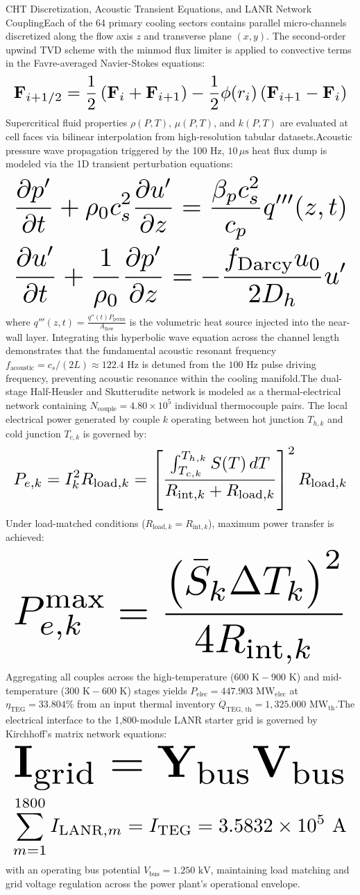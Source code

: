 CHT Discretization, Acoustic Transient Equations, and LANR Network CouplingEach of the 64 primary cooling sectors contains parallel micro-channels discretized along the flow axis $z$ and transverse plane $(x, y)$. The second-order upwind TVD scheme with the minmod flux limiter is applied to convective terms in the Favre-averaged Navier-Stokes equations:\[
\resizebox{\columnwidth}{!}{$\displaystyle \mathbf{F}_{i+1/2} = \frac{1}{2} \left( \mathbf{F}_i + \mathbf{F}_{i+1} \right) - \frac{1}{2} \phi(r_i) \left( \mathbf{F}_{i+1} - \mathbf{F}_i \right)$}
\]
Supercritical fluid properties $\rho(P, T)$, $\mu(P, T)$, and $k(P, T)$ are evaluated at cell faces via bilinear interpolation from high-resolution tabular datasets.Acoustic pressure wave propagation triggered by the 100 Hz, $10\,\mu\text{s}$ heat flux dump is modeled via the 1D transient perturbation equations:\[
\resizebox{\columnwidth}{!}{$\displaystyle \frac{\partial p'}{\partial t} + \rho_0 c_s^2 \frac{\partial u'}{\partial z} = \frac{\beta_p c_s^2}{c_p} q'''(z, t)$}
\]
\[
\resizebox{\columnwidth}{!}{$\displaystyle \frac{\partial u'}{\partial t} + \frac{1}{\rho_0} \frac{\partial p'}{\partial z} = - \frac{f_{\text{Darcy}} u_0}{2 D_h} u'$}
\]
where $q'''(z, t) = \frac{q''(t) P_{\text{perim}}}{A_{\text{flow}}}$ is the volumetric heat source injected into the near-wall layer. Integrating this hyperbolic wave equation across the channel length demonstrates that the fundamental acoustic resonant frequency $f_{\text{acoustic}} = c_s / (2 L) \approx 122.4\text{ Hz}$ is detuned from the $100\text{ Hz}$ pulse driving frequency, preventing acoustic resonance within the cooling manifold.The dual-stage Half-Heusler and Skutterudite network is modeled as a thermal-electrical network containing $N_{\text{couple}} = 4.80 \times 10^5$ individual thermocouple pairs. The local electrical power generated by couple $k$ operating between hot junction $T_{h, k}$ and cold junction $T_{c, k}$ is governed by:\[
\resizebox{\columnwidth}{!}{$\displaystyle P_{e, k} = I_k^2 R_{\text{load}, k} = \left[ \frac{\int_{T_{c, k}}^{T_{h, k}} S(T) \, dT}{R_{\text{int}, k} + R_{\text{load}, k}} \right]^2 R_{\text{load}, k}$}
\]
Under load-matched conditions ($R_{\text{load}, k} = R_{\text{int}, k}$), maximum power transfer is achieved:\[
\resizebox{\columnwidth}{!}{$\displaystyle P_{e, k}^{\text{max}} = \frac{\left( \bar{S}_k \Delta T_k \right)^2}{4 R_{\text{int}, k}}$}
\]
Aggregating all couples across the high-temperature ($600\text{ K} - 900\text{ K}$) and mid-temperature ($300\text{ K} - 600\text{ K}$) stages yields $P_{\text{elec}} = 447.903\text{ MW}_{\text{elec}}$ at $\eta_{\text{TEG}} = 33.804\%$ from an input thermal inventory $\dot{Q}_{\text{TEG, th}} = 1,325.000\text{ MW}_{\text{th}}$.The electrical interface to the 1,800-module LANR starter grid is governed by Kirchhoff's matrix network equations:\[
\resizebox{\columnwidth}{!}{$\displaystyle \mathbf{I}_{\text{grid}} = \mathbf{Y}_{\text{bus}} \mathbf{V}_{\text{bus}}$}
\]
\[
\resizebox{\columnwidth}{!}{$\displaystyle \sum_{m=1}^{1800} I_{\text{LANR}, m} = I_{\text{TEG}} = 3.5832 \times 10^5\text{ A}$}
\]
with an operating bus potential $V_{\text{bus}} = 1.250\text{ kV}$, maintaining load matching and grid voltage regulation across the power plant's operational envelope.